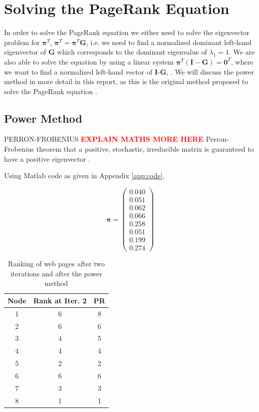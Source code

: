\documentclass[11pt]{report}
\begin{document}
\section{Solving the PageRank Equation} \label{sec:solve}
In order to solve the PageRank equation we either need to solve the eigenvector problem for $\boldsymbol{\pi}^T$, \(\boldsymbol{\pi}^T = \boldsymbol{\pi}^T\textbf{G}\), i.e. we need to find a normalized dominant left-hand eigenvector of \textbf{G} which corresponds to the dominant eigenvalue of $\lambda_1 = 1$. We are also able to solve the equation by using a linear system \(\boldsymbol{\pi}^T(\textbf{I}-\textbf{G})=\textbf{0}^T\), where we want to find a normalized left-hand vector of \textbf{I}-\textbf{G}, \cite{langville}. We will discuss the power method in more detail in this report, as this is the original method proposed to solve the PageRank equation \cite{langville}.

\subsection{Power Method} \label{sec:power}
PERRON-FROBENIUS \cite{meyer2000matrix}  \cite{gallager1992discrete} 
\textcolor{red}{\textbf{EXPLAIN MATHS MORE HERE}} Perron-Frobenius theorem that a positive, stochastic, irreducible matrix is guaranteed to have a positive eigenvector \cite{thorson2004modeling}.

Using Matlab code as given in Appendix \ref{app:code}, 

\[\boldsymbol\pi = \left(
\begin{array}{c}
0.040 \\
0.051 \\
0.062 \\
0.066 \\
0.258 \\
0.051 \\
0.199 \\
0.274
\end{array}
\right)\]

\begin{table}[H] \caption{Ranking of web pages after two iterations and after the power method}
 \centering
 \begin{tabular} {c| c c} 
 Node & Rank at Iter. 2 & PR \\ [0.5ex] 
 \hline
 1&6&8\\
 2&6&6\\
 3&4&5\\
 4&4&4\\
 5&2&2\\
 6&6&6\\
 7&3&3\\
 8&1&1\\
 \end{tabular}
 \label{Table:PR and summ}
\end{table}
\end{document}

